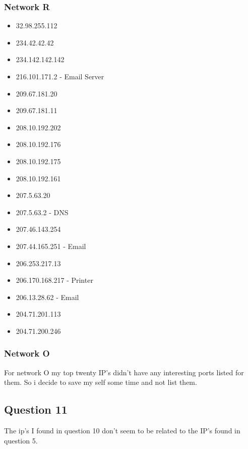 \documentclass[letterpaper, onecolumn,10pt]{IEEEtran}
\begin{document}
	        \subsubsection{Network R}
	            \begin{itemize}
	                \item 32.98.255.112
	                \item 234.42.42.42
	                \item 234.142.142.142
	                \item 216.101.171.2 - Email Server
	                \item 209.67.181.20
	                \item 209.67.181.11
	                \item 208.10.192.202
	                \item 208.10.192.176
	                \item 208.10.192.175
	                \item 208.10.192.161
	                \item 207.5.63.20
	                \item 207.5.63.2 - DNS
	                \item 207.46.143.254
	                \item 207.44.165.251 - Email
	                \item 206.253.217.13
	                \item 206.170.168.217 - Printer
	                \item 206.13.28.62 - Email
	                \item 204.71.201.113
	                \item 204.71.200.246
	            \end{itemize}
	        \subsubsection{Network O}
                For network O my top twenty IP's didn't have any interesting ports listed for them. So i decide to save my self some time and not list them.\\
	       \subsection{Question 11}
	       The ip's I found in question 10 don't seem to be related to the IP's found in question 5.\\
	       
\end{document}
